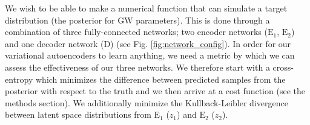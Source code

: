 \documentclass[%
showpacs,
 amsmath,amssymb,
 aps,
 twocolumn,
 prl,
 reprint,
floatfix,
]{revtex4-1}
\begin{document}

%
%
We wish to be able to make a numerical function that can
simulate a target distribution (the posterior for \ac{GW} parameters). This is done through a 
combination of three fully-connected networks; two encoder networks ($\textrm{E}_1$,
$\textrm{E}_2$) and one decoder network (D) (see Fig.
\ref{fig:network_config}). In order for our variational autoencoders to learn anything, we need a metric by which 
we can assess the effectiveness of our three networks. We therefore start with a cross-entropy which minimizes the difference between predicted samples from the posterior with respect to the truth and we then arrive at a cost function 
(see the methods section). We additionally minimize the Kullback-Leibler divergence 
between latent space distributions from $\textrm{E}_1$ ($z_1$) and 
$\textrm{E}_2$ ($z_2$). 
\end{document}
